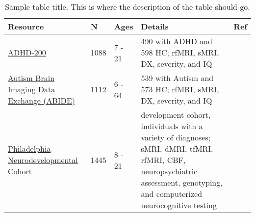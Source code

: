 \renewcommand{\arraystretch}{1.5}

\begin{table}[h!]
\caption{Sample table title. This is where the description of the table should go.}
      \begin{tabular}{L{2.5in} L{.25in} L{.35in} L{3in} L{.25in}}
		  Resource & N & Ages & Details & Ref \\ 
        \hline
		\href{http://fcon_1000.projects.nitrc.org/indi/adhd200}{ADHD-200} & 1088 & 7 - 21 & 490 with ADHD and 598 HC; rfMRI, sMRI, DX, severity, and IQ & \\
		\href{http://fcon_1000.projects.nitrc.org/indi/abide}{Autism Brain Imaging Data Exchange (ABIDE)} & 1112 & 6 - 64 & 539 with Autism and 573 HC; rfMRI, sMRI, DX, severity, and IQ &  \\
		\href{http://www.med.upenn.edu/bbl/projects/pnc/PhiladelphiaNeurodevelopmentalCohort.shtml}{Philadelphia Neurodevelopmental Cohort} & 1445 & 8 - 21 & development cohort, individuals with a variety of diagnoses; sMRI, dMRI, tfMRI, rfMRI, CBF, neuropsychiatric assessment, genotyping, and computerized neurocognitive testing & \\
      \end{tabular}
\end{table}